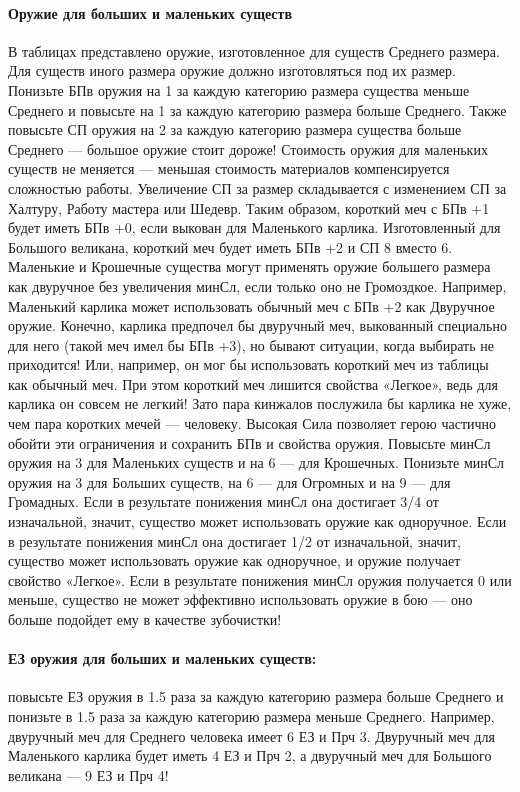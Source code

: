 \paragraph{Оружие для больших и маленьких существ}
В таблицах представлено оружие, изготовленное для существ Среднего размера. Для существ иного размера оружие должно изготовляться под их размер. Понизьте БПв оружия на 1 за каждую категорию размера существа меньше Среднего и повысьте на 1 за каждую категорию размера больше Среднего. Также повысьте СП оружия на 2 за каждую категорию размера существа больше Среднего — большое оружие стоит дороже! Стоимость оружия для маленьких существ не меняется — меньшая стоимость материалов компенсируется сложностью работы. Увеличение СП за размер складывается с изменением СП за Халтуру, Работу мастера или Шедевр.
\newline
Таким образом, короткий меч с БПв +1 будет иметь БПв +0, если выкован для Маленького карлика. Изготовленный для Большого великана, короткий меч будет иметь БПв +2 и СП 8 вместо 6.
Маленькие и Крошечные существа могут применять оружие большего размера как двуручное без увеличения минСл, если только оно не Громоздкое. Например, Маленький карлика может использовать обычный меч с БПв +2 как Двуручное оружие.
Конечно, карлика предпочел бы двуручный меч, выкованный специально для него (такой меч имел бы БПв +3), но бывают ситуации, когда выбирать не приходится! Или, например, он мог бы использовать короткий меч из таблицы как обычный меч. При этом короткий меч лишится свойства «Легкое», ведь для карлика он совсем не легкий! Зато пара кинжалов послужила бы карлика не хуже, чем пара коротких мечей — человеку.
\newline
Высокая Сила позволяет герою частично обойти эти ограничения и сохранить БПв и свойства оружия. Повысьте минСл оружия на 3 для Маленьких существ и на 6 — для Крошечных. Понизьте минСл оружия на 3 для Больших существ, на 6 — для Огромных и на 9 — для Громадных. Если в результате понижения минСл она достигает 3/4 от изначальной, значит, существо может использовать оружие как одноручное. Если в результате понижения минСл она достигает 1/2 от изначальной, значит, существо может использовать оружие как одноручное, и оружие получает свойство «Легкое». Если в результате понижения минСл оружия получается 0 или меньше, существо не может эффективно использовать оружие в бою — оно больше подойдет ему в качестве зубочистки!
\paragraph{ЕЗ оружия для больших и маленьких существ:} повысьте ЕЗ оружия в 1.5 раза за каждую категорию размера больше Среднего и понизьте в 1.5 раза за каждую категорию размера меньше Среднего. Например, двуручный меч для Среднего человека имеет 6 ЕЗ и Прч 3. Двуручный меч для Маленького карлика будет иметь 4 ЕЗ и Прч 2, а двуручный меч для Большого великана — 9 ЕЗ и Прч 4!




